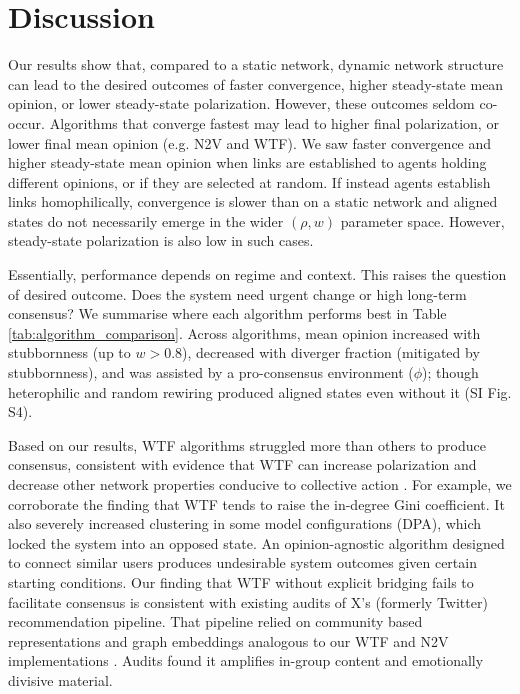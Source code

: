 \documentclass[unnumsec,webpdf,contemporary,large]{oup-authoring-template}%
\theoremstyle{thmstyleone}%
\theoremstyle{thmstyletwo}%
\theoremstyle{thmstylethree}%
\begin{document}
\section{Discussion}\label{sec:discussion}

Our results show that, compared to a static network, dynamic network structure can lead to the desired outcomes of faster convergence, higher steady-state mean opinion, or lower steady-state polarization. However, these outcomes seldom co-occur. Algorithms that converge fastest may lead to higher final polarization, or lower final mean opinion (e.g. N2V and WTF). We saw faster convergence and higher steady-state mean opinion when links are established to agents holding different opinions, or if they are selected at random. If instead agents establish links homophilically, convergence is slower than on a static network and aligned states do not necessarily emerge in the wider $(\rho, w)$ parameter space. However, steady-state polarization is also low in such cases.

Essentially, performance depends on regime and context. This raises the question of desired outcome. Does the system need urgent change or high long-term consensus? We summarise where each algorithm performs best in Table \ref{tab:algorithm_comparison}. Across algorithms, mean opinion increased with stubbornness (up to $w > 0.8$), decreased with diverger fraction (mitigated by stubbornness), and was assisted by a pro-consensus environment ($\phi$); though heterophilic and random rewiring produced aligned states even without it (SI Fig. S4).

Based on our results, WTF algorithms struggled more than others to produce consensus, consistent with evidence that WTF can increase polarization and decrease other network properties conducive to collective action \cite{su_effect_2016, ferrara_link_2022, espin-noboa_inequality_2022}. For example, we corroborate the finding that WTF tends to raise the in-degree Gini coefficient. It also severely increased clustering in some model configurations (DPA), which locked the system into an opposed state. An opinion-agnostic algorithm designed to connect similar users produces undesirable system outcomes given certain starting conditions. Our finding that WTF without explicit bridging fails to facilitate consensus is consistent with existing audits of X's (formerly Twitter) recommendation pipeline. That pipeline relied on community based representations and graph embeddings analogous to our WTF and N2V implementations \citep{el-kishkyTwHINEmbeddingTwitter2022, satuluriSimClustersCommunityBasedRepresentations2020}. Audits found it amplifies in-group content \citep{bouchaudCrowdsourcedAuditTwitters2023} and emotionally divisive material.
\end{document}
